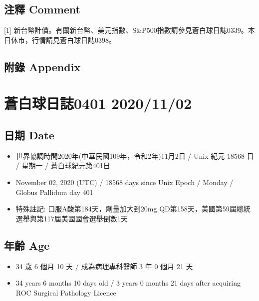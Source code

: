 \documentclass[
]{article}
\providecommand{\tightlist}{%
  \setlength{\itemsep}{0pt}\setlength{\parskip}{0pt}}
\begin{document}
\hypertarget{ux6ce8ux91cb-comment}{%
\subsection{注釋 Comment}\label{ux6ce8ux91cb-comment}}

{[}1{]}
新台幣計價。有關新台幣、美元指數、S\&P500指數請參見蒼白球日誌0339。本日休市，行情請見蒼白球日誌0398。

\hypertarget{ux9644ux9304-appendix}{%
\subsection{附錄 Appendix}\label{ux9644ux9304-appendix}}

\hypertarget{ux84bcux767dux7403ux65e5ux8a8c0401-20201102}{%
\section{蒼白球日誌0401
2020/11/02}\label{ux84bcux767dux7403ux65e5ux8a8c0401-20201102}}

\hypertarget{ux65e5ux671f-date-1}{%
\subsection{日期 Date}\label{ux65e5ux671f-date-1}}

\begin{itemize}
\tightlist
\item
  世界協調時間2020年(中華民國109年，令和2年)11月2日 / Unix 紀元 18568 日
  / 星期一 / 蒼白球紀元第401日
\item
  November 02, 2020 (UTC) / 18568 days since Unix Epoch / Monday /
  Globus Pallidum day 401
\item
  特殊註記: 口服A酸第184天，劑量加大到20mg
  QD第158天，美國第59屆總統選舉與第117屆美國國會選舉倒數1天
\end{itemize}

\hypertarget{ux5e74ux9f61-age-1}{%
\subsection{年齡 Age}\label{ux5e74ux9f61-age-1}}

\begin{itemize}
\tightlist
\item
  34 歲 6 個月 10 天 / 成為病理專科醫師 3 年 0 個月 21 天
\item
  34 years 6 months 10 days old / 3 years 0 months 21 days after
  acquiring ROC Surgical Pathology Licence
\end{itemize}
\end{document}
